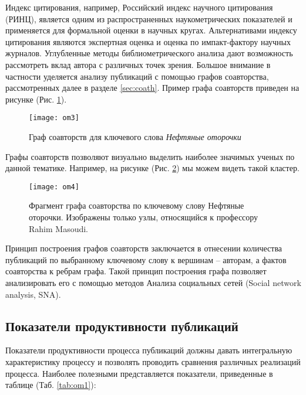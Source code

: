 Индекс цитирования, например, Российский индекс научного цитирования (РИНЦ), является одним из распространенных наукометрических показателей и применяется для формальной оценки в научных кругах.
Альтернативами индексу цитирования являются экспертная оценка и оценка по импакт-фактору научных журналов.
Углубленные методы библиометрического анализа дают возможность рассмотреть вклад автора с различных точек зрения.
Большое внимание в частности уделяется анализу публикаций с помощью графов соавторства, рассмотренных далее в разделе \ref{sec:coath}. 
Пример графа соавторств приведен на рисунке (Рис. \ref{fig:om3}).

\begin{figure}[H]
  \centering
    \texttt{[image: om3]}
  \label{fig:om3}
  \caption{Граф соавторств для ключевого слова \textit{Нефтяные оторочки}}
\end{figure}  

Графы соавторств позволяют визуально выделить наиболее значимых ученых по данной тематике. Например, на рисунке (Рис. \ref{fig:om4}) мы можем видеть такой кластер. 

\begin{figure}[H]
  \centering
    \texttt{[image: om4]}
  \label{fig:om4}
  \caption{Фрагмент графа соавторства по ключевому слову Нефтяные оторочки. Изображены только узлы, относящийся к профессору Rahim Masoudi.}
\end{figure} 

Принцип построения графов соавторств заключается в отнесении количества публикаций по выбранному ключевому слову к вершинам – авторам, а фактов соавторства к ребрам графа. 
Такой принцип построения графа позволяет анализировать его с помощью методов Анализа социальных сетей (Social network analysis, SNA).

\subsection{Показатели продуктивности публикаций}
Показатели продуктивности процесса публикаций должны давать интегральную характеристику процессу и позволять проводить сравнения различных реализаций процесса. Наиболее полезными представляется показатели, приведенные в таблице (Таб. \ref{tab:om1}):

\begin{table}[H]
\centering
\caption{Показатели продуктивности процесса публикаций}
\label{tab:om1}
\end{table}

